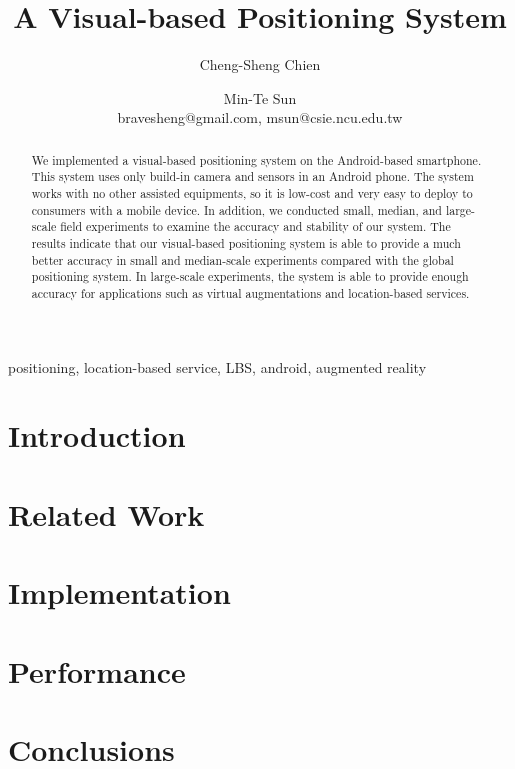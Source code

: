\documentclass[oribibl]{llncs}
\begin{document}
\title{A Visual-based Positioning System}


\author{Cheng-Sheng Chien \and Min-Te Sun
\\bravesheng@gmail.com, msun@csie.ncu.edu.tw }
\maketitle
\begin{abstract}
We implemented a visual-based positioning system on the Android-based smartphone. This system uses only build-in camera and sensors in an Android phone. The system works with no other assisted equipments, so it is low-cost and very easy to deploy to consumers with a mobile device. In addition, we conducted small, median, and large-scale field experiments to examine the accuracy and stability of our system. The results indicate that our visual-based positioning system is able to provide a much better accuracy in small and median-scale experiments compared with the global positioning system. In large-scale experiments, the system is able to provide enough accuracy for applications such as virtual augmentations and location-based services.
\end{abstract}
\begin{keywords}
positioning, location-based service, LBS, android, augmented reality
\end{keywords}
\section{Introduction}
\label{introduction}

\section{Related Work}
\label{Related Work}

\section{Implementation}
\label{Implementation}

\section{Performance}
\label{Performance}

\section{Conclusions}
\label{Conclusions}

 

\end{document}
